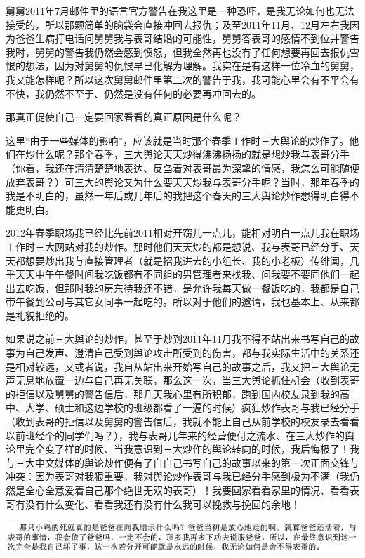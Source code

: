 \documentclass[9pt, b5paper]{article}
\begin{document}
舅舅2011年7月邮件里的语言官方警告在我这里是一种恐吓，是我无论如何也无法接受的，所以那颗简单的脑袋会直接冲回去报仇；及至2011年11月、12月左右我因为爸爸生病打电话问舅舅我与表哥结婚的可能性，舅舅答表哥的感情不到位并警告我时，舅舅的警告我仍然会感到愤怒，但我全然再也没有了任何想要再回去报仇雪恨的想法，因为对舅舅的仇恨早已化解为理解。我实在是有这样一位冷血的舅舅，我又能怎样呢？所以这次舅舅邮件里第二次的警告于我，我可能心里会有不平会有不快，我仍然不至于、仍然是没有任何的必要再冲回去的。

那真正促使自己一定要回家看看的真正原因是什么呢？

这里“由于一些媒体的影响”，应该就是当时那个春季工作时三大舆论的炒作了。他们在炒什么呢？那个春季，三大舆论天天炒得沸沸扬扬的就是想炒我与表哥分手（你看，我还在清清楚楚地表达、反刍着对表哥最为深挚的情感，我怎么可能随便放弃表哥？）可三大的舆论又为什么要天天炒我与表哥分手呢？当时，那年春季的我是不明白的，虽然一年后或几年后的我把这个春天的三大舆论炒作想得明白得不能更明白。

2012年春季职场我已经比先前2011相对开窃儿一点儿，能相对明白一点儿我在职场工作时三大网站对我的炒作。那时他们天天炒的都是想说、我与表哥已经分手、天天都想要炒出我与直接管理者（就是招我进去的小组长、我的小老板）传绯闻，几乎天天中午午餐时间我吃饭都有不同组的男管理者来找我、问我要不要同他们一起出去吃饭，但那时我的房东待我还不错，是允许我每天做一餐饭吃的，我都是自己带午餐到公司与其它女同事一起吃的。所以对于他们的邀请，我也基本上、从来都是礼貌拒绝的。

如果说之前三大舆论的炒作，甚至于炒到2011年11月我不得不站出来书写自己的故事为自己发声、澄清自己受到舆论攻击所受到的伤害，都与我实际生活中的关系还是相对较远，又或者说，我自从站出来开始写自己的故事之后，我又把三大舆论无声无息地放置一边与自己再无关联，那么这一次，当三大舆论抓住机会（收到表哥的拒信以及舅舅的警告信后，那几天我心里有所积郁，跑到国内校友录到我的高中、大学、硕士和这边学校的班级都看了一遍的时候）疯狂炒作表哥与我已经分手（收到表哥的拒信以及舅舅的警告信后，我就不能上自己从前学校的校友录去看看以前班经个的同学们吗？），我与表哥几年来的经营便付之流水、在三大炒作的舆论里完全变了样的时候、当我意识到三大炒作的舆论转向的时候，我后悔极了！我与三大中文媒体的舆论炒作便有了自自己书写自己的故事以来的第一次正面交锋与冲突：因为表哥对我狠重要，我对舆论炒作表哥与我已经分手感到极为不满（我仍然是全心全意爱着自己那个绝世无双的表哥）！我要回家看看家里的情况、看看表哥有没有什么变化、看看我还有没有什么我可以挽救与挽回的余地！

\begin{center}
\includegraphics[width=.9\linewidth]{./pic/p1p118-5.png}
\end{center}
\end{document}
